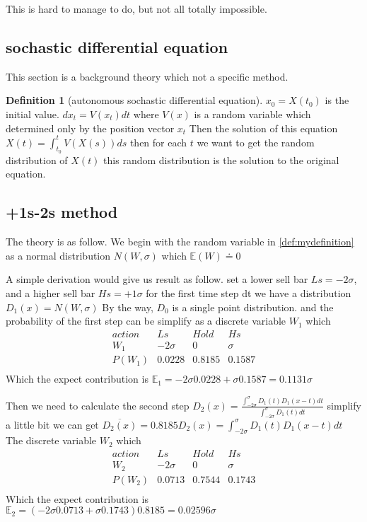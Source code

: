 \documentclass{article}
\theoremstyle{definition} %
\newtheorem{definition}{Definition}[section]
\begin{document}
This is hard to manage to do, but not all totally
impossible.
\subsection{sochastic differential equation}
This section is a background theory which not
a specific method.
\begin{definition}[autonomous sochastic differential equation]
    \label{def:aSDE}
    $x_0=X(t_0)$ is the initial value.
    $dx_t=V(x_t)dt$
    where $V(x)$ is a random variable
    which determined only by the position
    vector $x_t$
    Then the solution of this equation
    $X(t)=\int_{t_0}^tV(X(s))ds$
    then for each $t$
    we want to get the random distribution of
    $X(t)$ this random distribution is
    the solution to the original equation.
\end{definition}

\subsection{+1s-2s method}
The theory is as follow.
We begin with the random variable in
\ref{def:mydefinition} as a normal distribution
$N(W,\sigma)$ which $\mathbb{E}(W)\doteq 0$

A simple derivation would give us result as follow.
set a lower sell bar $Ls=-2\sigma$,
and a higher sell bar $Hs=+1\sigma$
for the first time step dt we have a distribution
$D_1(x)=N(W,\sigma)$
By the way, $D_0$ is a single point distribution.
and the probability of the first step can
be simplify as a discrete variable $W_1$ which
$$
    \begin{array}{c|ccc}
        action & Ls       & Hold   & Hs     \\
        W_1    & -2\sigma & 0      & \sigma \\
        \hline
        P(W_1) & 0.0228   & 0.8185 & 0.1587 \\
    \end{array}
$$
Which the expect contribution is
$\mathbb{E}_1
    =-2\sigma0.0228+\sigma0.1587
    =0.1131\sigma$

Then we need to calculate the second step
$D_2(x)=
    \frac{\int_{-2\sigma}^{\sigma}D_1(t)D_1(x-t)dt}
    {\int_{-2\sigma}^{\sigma}D_1(t)dt}$
simplify a little bit we can get
$\overline{D_2(x)}=0.8185D_2(x)=
    \int_{-2\sigma}^{\sigma}D_1(t)D_1(x-t)dt$
The discrete variable $W_2$ which
$$
    \begin{array}{c|ccc}
        action & Ls       & Hold   & Hs     \\
        W_2    & -2\sigma & 0      & \sigma \\
        \hline
        P(W_2) & 0.0713   & 0.7544 & 0.1743 \\
    \end{array}
$$
Which the expect contribution is
$\mathbb{E}_2
    =(-2\sigma0.0713+\sigma0.1743)0.8185
    =0.02596\sigma$
\end{document}
